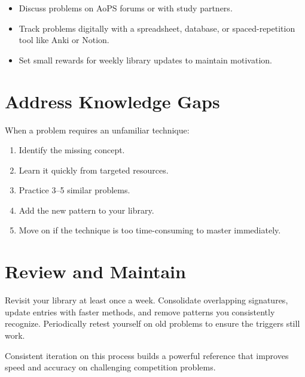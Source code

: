 \documentclass[11pt]{article}
\begin{document}
\begin{itemize}[leftmargin=*]
    \item Discuss problems on AoPS forums or with study partners.
    \item Track problems digitally with a spreadsheet, database, or spaced-repetition tool like Anki or Notion.
    \item Set small rewards for weekly library updates to maintain motivation.
\end{itemize}

\section{Address Knowledge Gaps}

When a problem requires an unfamiliar technique:

\begin{enumerate}[leftmargin=*]
    \item Identify the missing concept.
    \item Learn it quickly from targeted resources.
    \item Practice 3--5 similar problems.
    \item Add the new pattern to your library.
    \item Move on if the technique is too time-consuming to master immediately.
\end{enumerate}

\section{Review and Maintain}

Revisit your library at least once a week. Consolidate overlapping signatures, update entries with faster methods, and remove patterns you consistently recognize. Periodically retest yourself on old problems to ensure the triggers still work.

Consistent iteration on this process builds a powerful reference that improves speed and accuracy on challenging competition problems.
\end{document}

